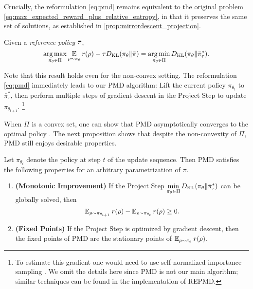 Crucially, the reformulation \cref{eq:pmd} remains equivalent to the
original problem \cref{eq:max_expected_reward_plus_relative_entropy},
in that it preserves the same set of solutions,
as established in \cref{prop:mirrordescent_projection}.

\begin{prop}
\label{prop:mirrordescent_projection}
Given a \emph{reference policy} $\bar{\pi}$,
{\small
\begin{equation*}
	\operatorname*{arg\,max}\limits_{\pi_\theta \in \Pi} { \operatorname*{\mathbb{E}}\limits_{\rho \sim \pi_\theta}{  r(\rho)  - \tau D_{\mathrm{KL}}(\pi_\theta \| \bar{\pi}) } } 
 = \operatorname*{arg\,min}\limits_{\pi_\theta \in \Pi}{ D_{\mathrm{KL}}(\pi_\theta \| \bar{\pi}_\tau^*) }.
\end{equation*}
}
\end{prop}

Note that this result holds even for the non-convex setting.
%
The reformulation \cref{eq:pmd} immediately leads to our PMD algorithm:
Lift the current policy $\pi_{\theta_t}$ to $\bar{\pi}_\tau^*$,
then perform multiple steps of gradient descent in the Project Step
to update $\pi_{\theta_{t+1}}$.%
%
\footnote{
To estimate this gradient one would need to use self-normalized importance
sampling \cite{owen2013monte}.
We omit the details here since PMD is not our main algorithm;
similar techniques can be found in the implementation of REPMD. 
}

When $\Pi$ is a convex set, one can show that PMD asymptotically converges to the optimal policy \citep{nemirovskii1983problem,beck2003mirror}. 
The next proposition shows that despite the non-convexity of $\Pi$,
PMD still enjoys desirable properties.

\begin{prop}
\label{prop:monoto_policymirrordescent}
Let $\pi_{\theta_{t}}$ denote the policy at step $t$ of
the update sequence.
Then PMD satisfies the following properties for an arbitrary 
parametrization of $\pi$.
\begin{enumerate}
	\item {\bf (Monotonic Improvement)} 
	If the Project Step $\min\limits_{\pi_\theta \in \Pi}{D_{\mathrm{KL}}( \pi_\theta \| \bar{\pi}_{\tau}^* )}$ can be globally solved, then
	 \begin{equation*}
	\operatorname{\mathbb{E}}_{\rho \sim \pi_{\theta_{t+1}}}{r(\rho)} - \operatorname{\mathbb{E}}_{\rho \sim \pi_{\theta_{t}}}{  r(\rho)} \ge 0.
	\end{equation*}
	\item {\bf (Fixed Points)} If the Project Step is optimized by gradient descent, then the fixed points of PMD are the 
	 stationary points of $\operatorname{\mathbb{E}}_{\rho \sim \pi_\theta}{  r(\rho)}$. 
\end{enumerate}
\end{prop}

